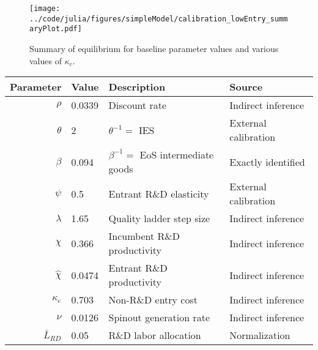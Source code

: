 \documentclass[11pt,english]{article}
\begin{document}
\begin{figure}[]
	\texttt{[image: ../code/julia/figures/simpleModel/calibration\_lowEntry\_summaryPlot.pdf]}
	\caption{Summary of equilibrium for baseline parameter values and various values of $\kappa_c$.}
	\label{calibration_lowEntry_summaryPlot}
\end{figure}

\begin{table}[]
	\centering
	\label{calibration_lowEntry_parameters}
	\begin{tabular}{rlll}
		\toprule \toprule
		Parameter & Value & Description & Source \tabularnewline
		\midrule
		$\rho$ & 0.0339 & Discount rate  & Indirect inference \tabularnewline
		$\theta$ & 2 & $\theta^{-1} = $ IES & External calibration 
		\tabularnewline
		$\beta$ & 0.094 & $\beta^{-1} = $ EoS intermediate goods & Exactly identified \tabularnewline 
		$\psi$ & 0.5 & Entrant R\&D elasticity & External calibration \tabularnewline
		$\lambda$ & 1.65 & Quality ladder step size & Indirect inference 
		\tabularnewline
		$\chi$ & 0.366 & Incumbent R\&D productivity & Indirect inference 
		\tabularnewline
		$\hat{\chi}$ & 0.0474 & Entrant R\&D productivity & Indirect inference \tabularnewline 
		$\kappa_e$ & 0.703 & Non-R\&D entry cost & Indirect inference \tabularnewline
		$\nu$ & 0.0126 & Spinout generation rate  & Indirect inference\tabularnewline
		$\bar{L}_{RD}$ & 0.05 & R\&D labor allocation  & Normalization \tabularnewline
		\bottomrule
	\end{tabular}
\end{table}
\end{document}
